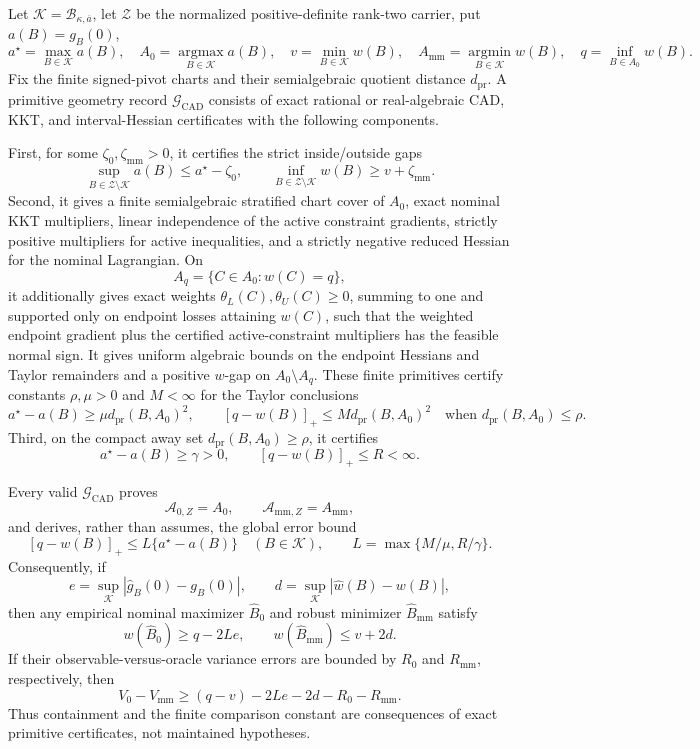 Let \(\mathcal K=\mathcal B_{\kappa,\overline a}\), let \(\mathcal Z\) be the normalized positive-definite rank-two carrier, put \(a(B)=g_B(0)\),
\[
a^\star=\max_{B\in\mathcal K}a(B),
\quad
A_0=\operatorname*{argmax}_{B\in\mathcal K}a(B),
\quad
v=\min_{B\in\mathcal K}w(B),
\quad
A_{\mathrm{mm}}=\operatorname*{argmin}_{B\in\mathcal K}w(B),
\quad
q=\inf_{B\in A_0}w(B).
\]
Fix the finite signed-pivot charts and their semialgebraic quotient distance \(d_{\mathrm{pr}}\).  A primitive geometry record \(\mathscr G_{\mathrm{CAD}}\) consists of exact rational or real-algebraic CAD, KKT, and interval-Hessian certificates with the following components.

First, for some \(\zeta_0,\zeta_{\mathrm{mm}}>0\), it certifies the strict inside/outside gaps
\[
\sup_{B\in\mathcal Z\setminus\mathcal K}a(B)
\le a^\star-\zeta_0,
\qquad
\inf_{B\in\mathcal Z\setminus\mathcal K}w(B)
\ge v+\zeta_{\mathrm{mm}}.
\tag{G1}
\]
Second, it gives a finite semialgebraic stratified chart cover of \(A_0\), exact nominal KKT multipliers, linear independence of the active constraint gradients, strictly positive multipliers for active inequalities, and a strictly negative reduced Hessian for the nominal Lagrangian.  On
\[
A_q=\{C\in A_0:w(C)=q\},
\]
it additionally gives exact weights \(\theta_L(C),\theta_U(C)\ge0\), summing to one and supported only on endpoint losses attaining \(w(C)\), such that the weighted endpoint gradient plus the certified active-constraint multipliers has the feasible normal sign.  It gives uniform algebraic bounds on the endpoint Hessians and Taylor remainders and a positive \(w\)-gap on \(A_0\setminus A_q\).  These finite primitives certify constants \(\rho,\mu>0\) and \(M<\infty\) for the Taylor conclusions
\[
a^\star-a(B)\ge\mu d_{\mathrm{pr}}(B,A_0)^2,
\qquad
[q-w(B)]_+\le M d_{\mathrm{pr}}(B,A_0)^2
\quad\text{when }d_{\mathrm{pr}}(B,A_0)\le\rho.
\tag{G2}
\]
Third, on the compact away set \(d_{\mathrm{pr}}(B,A_0)\ge\rho\), it certifies
\[
a^\star-a(B)\ge\gamma>0,
\qquad
[q-w(B)]_+\le R<\infty.
\tag{G3}
\]

Every valid \(\mathscr G_{\mathrm{CAD}}\) proves
\[
\mathcal A_{0,Z}=A_0,
\qquad
\mathcal A_{\mathrm{mm},Z}=A_{\mathrm{mm}},
\]
and derives, rather than assumes, the global error bound
\[
[q-w(B)]_+
\le L\{a^\star-a(B)\}
\quad(B\in\mathcal K),
\qquad
L=\max\{M/\mu,R/\gamma\}.
\tag{G4}
\]
Consequently, if
\[
e=\sup_{\mathcal K}|\widehat g_B(0)-g_B(0)|,
\qquad
d=\sup_{\mathcal K}|\widehat w(B)-w(B)|,
\]
then any empirical nominal maximizer \(\widehat B_0\) and robust minimizer \(\widehat B_{\mathrm{mm}}\) satisfy
\[
w(\widehat B_0)\ge q-2Le,
\qquad
w(\widehat B_{\mathrm{mm}})\le v+2d.
\]
If their observable-versus-oracle variance errors are bounded by \(R_0\) and \(R_{\mathrm{mm}}\), respectively, then
\[
V_0-V_{\mathrm{mm}}
\ge(q-v)-2Le-2d-R_0-R_{\mathrm{mm}}.
\tag{G5}
\]
Thus containment and the finite comparison constant are consequences of exact primitive certificates, not maintained hypotheses.